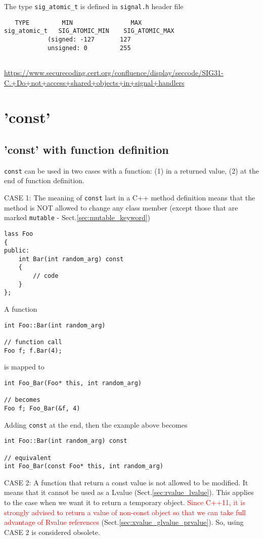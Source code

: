 The type \verb!sig_atomic_t! is defined in \verb!signal.h! header file
\begin{verbatim}
   TYPE         MIN                MAX
sig_atomic_t   SIG_ATOMIC_MIN    SIG_ATOMIC_MAX
            (signed: -127       127
            unsigned: 0         255
            
\end{verbatim}

\url{https://www.securecoding.cert.org/confluence/display/seccode/SIG31-C.+Do+not+access+shared+objects+in+signal+handlers}


\section{'const'}
\label{sec:const_keywords}

\subsection{'const' with function definition}
\label{sec:const_function}

\verb!const! can be used in two cases with a function: (1) in a returned value,
(2) at the end of function definition.

CASE 1: The meaning of \verb!const! last in a C++ method definition means that
the method is NOT allowed to change any class member (except those that are marked
\verb!mutable! - Sect.\ref{sec:mutable_keyword}) 
\begin{verbatim}
lass Foo 
{
public:
    int Bar(int random_arg) const
    {
        // code
    }
};
\end{verbatim}

A function 
\begin{verbatim}
int Foo::Bar(int random_arg)

// function call
Foo f; f.Bar(4);
\end{verbatim}
is mapped to
\begin{verbatim}
int Foo_Bar(Foo* this, int random_arg)

// becomes
Foo f; Foo_Bar(&f, 4)
\end{verbatim}

Adding \verb!const! at the end, then the example above becomes
\begin{verbatim}
int Foo::Bar(int random_arg) const

// equivalent
int Foo_Bar(const Foo* this, int random_arg)
\end{verbatim}


CASE 2: A function that return a const value is not allowed to be modified. It
means that it cannot be used as a Lvalue (Sect.\ref{sec:rvalue_lvalue}). This
applies to the case when we want it to return a temporary object.
\textcolor{red}{Since C++11, it is strongly advised to return a value of
non-const object so that we can take full advantage of Rvalue references}
(Sect.\ref{sec:xvalue_glvalue_prvalue}). So, using CASE 2 is considered
obsolete.

